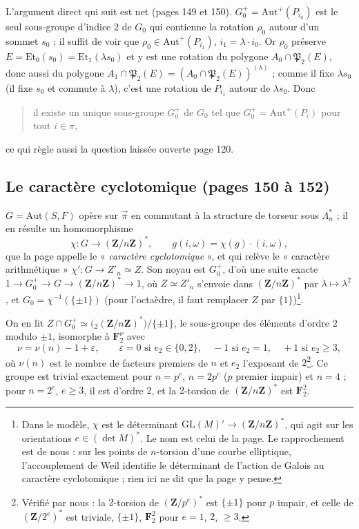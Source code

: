 \documentclass[11pt,a4paper]{article}
\begin{document}
L'argument direct qui suit est net (pages 149 et 150). $G_0^{+} =
\mathrm{Aut}^{+}(P_{i_0})$ est le seul sous-groupe d'indice $2$ de $G_0$ qui
contienne la rotation $\rho_0$ autour d'un sommet $s_0$ ; il suffit de voir que
$\rho_0 \in \mathrm{Aut}^{+}(P_{i_1})$, $i_1 = \lambda \cdot i_0$. Or $\rho_0$
préserve $E = \mathrm{Et}_0(s_0) = \mathrm{Et}_1(\lambda s_0)$ et y est une
rotation du polygone $A_0 \cap \mathfrak{P}_2(E)$, donc aussi du polygone
$A_1 \cap \mathfrak{P}_2(E) = (A_0 \cap \mathfrak{P}_2(E))^{(\lambda)}$ ; comme il
fixe $\lambda s_0$ (il fixe $s_0$ et commute à $\lambda$), c'est une rotation
de $P_{i_1}$ autour de $\lambda s_0$. Donc
\begin{quote}
  il existe un unique sous-groupe $G_0^{+}$ de $G_0$ tel que $G_0^{+} =
  \mathrm{Aut}^{+}(P_i)$ pour tout $i \in \pi$,
\end{quote}
ce qui règle aussi la question laissée ouverte page 120.

\subsection*{Le caractère cyclotomique (pages 150 à 152)}

$G = \mathrm{Aut}(S, F)$ opère sur $\overrightarrow{\pi}$ en commutant à la
structure de torseur sous $\Lambda_n^{*}$ ; il en résulte un homomorphisme
\[
  \chi : G \longrightarrow (\mathbf{Z}/n\mathbf{Z})^{*}, \qquad
  g(i, \omega) = \chi(g) \cdot (i, \omega) ,
\]
que la page appelle le « \emph{caractère cyclotomique} », et qui relève le
« caractère arithmétique » $\chi' : G \to Z'_n \simeq Z$. Son noyau est
$G_0^{+}$, d'où une suite exacte $1 \to G_0^{+} \to G \to
(\mathbf{Z}/n\mathbf{Z})^{*} \to 1$, où $Z \simeq Z'_n$ s'envoie dans
$(\mathbf{Z}/n\mathbf{Z})^{*}$ par $\dot\lambda \mapsto \lambda^2$, et $G_0 =
\chi^{-1}(\{\pm 1\})$ (pour l'octaèdre, il faut remplacer $Z$ par
$\{1\}$)\footnote{Dans le modèle, $\chi$ est le déterminant $\mathrm{GL}(M)'
\to (\mathbf{Z}/n\mathbf{Z})^{*}$, qui agit sur les orientations $e \in (\det
M)^{*}$. Le nom est celui de la page. Le rapprochement est de nous : sur les
points de $n$-torsion d'une courbe elliptique, l'accouplement de Weil identifie
le déterminant de l'action de Galois au caractère cyclotomique ; rien ici ne dit
que la page y pense.}.

On en lit $Z \cap G_0^{+} \simeq \bigl({}_2(\mathbf{Z}/n\mathbf{Z})^{*}\bigr)/\{\pm
1\}$, le sous-groupe des éléments d'ordre $2$ modulo $\pm 1$, isomorphe à
$\mathbf{F}_2^{\nu}$ avec
\[
  \nu = \nu(n) - 1 + \varepsilon, \qquad
  \varepsilon = 0 \text{ si } e_2 \in \{0, 2\}, \quad -1 \text{ si } e_2 = 1,
  \quad +1 \text{ si } e_2 \geq 3 ,
\]
où $\nu(n)$ est le nombre de facteurs premiers de $n$ et $e_2$ l'exposant de
$2$\footnote{Vérifié par nous : la $2$-torsion de $(\mathbf{Z}/p^e)^{*}$ est
$\{\pm 1\}$ pour $p$ impair, et celle de $(\mathbf{Z}/2^e)^{*}$ est triviale,
$\{\pm 1\}$, $\mathbf{F}_2^2$ pour $e = 1$, $2$, $\geq 3$.}. Ce groupe est
trivial exactement pour $n = p^e$, $n = 2p^e$ ($p$ premier impair) et $n = 4$ ;
pour $n = 2^e$, $e \geq 3$, il est d'ordre $2$, et la $2$-torsion de
$(\mathbf{Z}/n\mathbf{Z})^{*}$ est $\mathbf{F}_2^2$.
\end{document}
